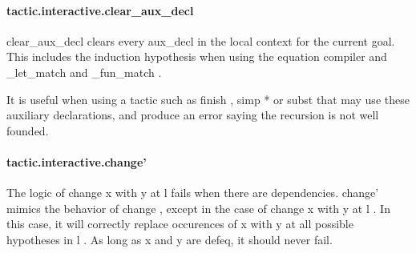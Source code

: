 \documentclass{article}
\begin{document}
\paragraph{tactic.interactive.clear\_aux\_decl}
\par
\colorbox[RGB]{253,246,227}{{{{\color[RGB]{101, 123, 131} clear\_aux\_decl }}}} clears every 
\colorbox[RGB]{253,246,227}{{{{\color[RGB]{101, 123, 131} aux\_decl }}}} in the local context for the current goal.
This includes the induction hypothesis when using the equation compiler and
\colorbox[RGB]{253,246,227}{{{{\color[RGB]{101, 123, 131} \_let\_match }}}} and 
\colorbox[RGB]{253,246,227}{{{{\color[RGB]{101, 123, 131} \_fun\_match }}}}.
\par
It is useful when using a tactic such as 
\colorbox[RGB]{253,246,227}{{{{\color[RGB]{101, 123, 131} finish }}}}, 
\colorbox[RGB]{253,246,227}{{{{\color[RGB]{101, 123, 131} simp  }}}{{{\color[RGB]{181, 137, 0} * }}}} or 
\colorbox[RGB]{253,246,227}{{{{\color[RGB]{101, 123, 131} subst }}}} that may use these
auxiliary declarations, and produce an error saying the recursion is not well founded.
\paragraph{tactic.interactive.change'}
\par
The logic of 
\colorbox[RGB]{253,246,227}{{{{\color[RGB]{101, 123, 131} change x  }}}{{{\color[RGB]{133, 153, 0} with }}}{{{\color[RGB]{101, 123, 131}  y  }}}{{{\color[RGB]{133, 153, 0} at }}}{{{\color[RGB]{101, 123, 131}  l }}}} fails when there are dependencies.
\colorbox[RGB]{253,246,227}{{{{\color[RGB]{101, 123, 131} change' }}}} mimics the behavior of 
\colorbox[RGB]{253,246,227}{{{{\color[RGB]{101, 123, 131} change }}}}, except in the case of 
\colorbox[RGB]{253,246,227}{{{{\color[RGB]{101, 123, 131} change x  }}}{{{\color[RGB]{133, 153, 0} with }}}{{{\color[RGB]{101, 123, 131}  y  }}}{{{\color[RGB]{133, 153, 0} at }}}{{{\color[RGB]{101, 123, 131}  l }}}}.
In this case, it will correctly replace occurences of 
\colorbox[RGB]{253,246,227}{{{{\color[RGB]{101, 123, 131} x }}}} with 
\colorbox[RGB]{253,246,227}{{{{\color[RGB]{101, 123, 131} y }}}} at all possible hypotheses in 
\colorbox[RGB]{253,246,227}{{{{\color[RGB]{101, 123, 131} l }}}}.
As long as 
\colorbox[RGB]{253,246,227}{{{{\color[RGB]{101, 123, 131} x }}}} and 
\colorbox[RGB]{253,246,227}{{{{\color[RGB]{101, 123, 131} y }}}} are defeq, it should never fail.
\end{document}
